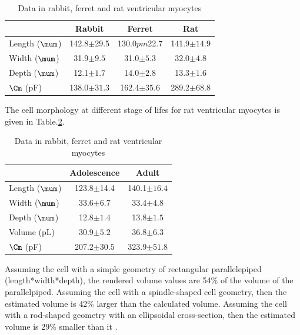 \begin{table}[hbt]
\begin{center}
    \begin{tabular}{lccc}
        \hline
        & Rabbit & Ferret & Rat \\
    \hline \hline
    Length ($\mum$) & 142.8$\pm$29.5 & 130.0$pm$22.7 & 141.9$\pm 14.9$ \\
	Width ($\mum$) & 31.9$\pm 9.5$ & 31.0$\pm 5.3$ & 32.0$\pm 4.8$ \\
	Depth ($\mum$) & 12.1$\pm 1.7$ & 14.0$\pm 2.8$ & 13.3$\pm 1.6$\\
	$\Cm$ (pF)  &   138.0$\pm 31.3$ & 162.4$\pm 35.6$ & 289.2$\pm 68.8$ \\
    \end{tabular}
\end{center}
\caption{Data in rabbit, ferret and rat ventricular myocytes \citep{satoh1996svr}}
\label{tab:volume_data}
\end{table}

The cell morphology at different stage of lifes for rat ventricular myocytes is
given in Table.\ref{tab:volume_data_rat_young_adult}.

\begin{table}[hbt]
\begin{center}
    \begin{tabular}{lcc}
        \hline
        & Adolescence & Adult \\
    \hline \hline
    Length ($\mum$) & 123.8$\pm$14.4 &  140.1$\pm 16.4$ \\
	Width ($\mum$) & 33.6$\pm 6.7$ & 33.4$\pm 4.8$ \\
	Depth ($\mum$) & 12.8$\pm 1.4$ & 13.8$\pm 1.5$\\
	Volume (pL) & 30.9$\pm 5.2$ & 36.8$\pm 6.3$ \\
	$\Cm$ (pF)  &   207.2$\pm 30.5$ & 323.9$\pm 51.8$ \\
    \end{tabular}
\end{center}
\caption{Data in rabbit, ferret and rat ventricular myocytes \citep{satoh1996svr}}
\label{tab:volume_data_rat_young_adult}
\end{table}

Assuming the cell with a simple geometry of rectangular parallelepiped
(length*width*depth), the rendered volume values are 54\% of the volume of the
parallelpiped. Assuming the cell with a spindle-shaped cell geometry, then the
estimated volume is 42\% larger than the calculated volume. Assuming the cell
with a rod-shaped geometry with an ellipsoidal cross-section, then the estimated
volume is 29\% smaller than it \citep{satoh1996svr}.

